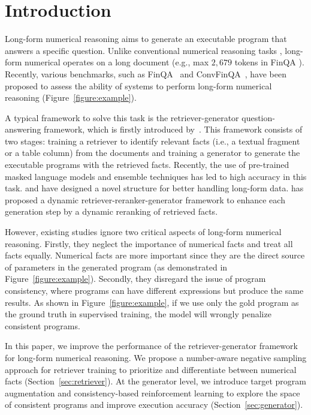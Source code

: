 \documentclass[11pt]{article}
\begin{document}
\section{Introduction}
Long-form numerical reasoning aims to generate an executable program that answers a specific question. Unlike conventional numerical reasoning tasks \cite{mackenzie2008engine}, long-form numerical operates on a long document (e.g., max $2,679$ tokens in FinQA \cite{chen2021finqa}). Recently, various benchmarks, such as FinQA~\cite{chen2021finqa} and ConvFinQA~\cite{convfinqa}, have been proposed to assess the ability of systems to perform long-form numerical reasoning (Figure~\ref{figure:example}). 






A typical framework to solve this task is the retriever-generator question-answering framework, which is firstly introduced by~\citet{chen2021finqa}. 
This framework consists of two stages: training a retriever to identify relevant facts (i.e., a textual fragment or a table column) from the documents and training a generator to generate the executable programs with the retrieved facts. Recently, the use of pre-trained masked language models and ensemble techniques \cite{wang2022novel, zhang2022robustly, wang2022numerical} has led to high accuracy in this task. \citet{zhang2022elastic} and \citet{tablet5} have designed a novel structure for better handling long-form data. \citet{dyrren} has proposed a dynamic retriever-reranker-generator framework to enhance each generation step by a dynamic reranking of retrieved facts.




However, existing studies ignore two critical aspects of long-form numerical reasoning. Firstly, they neglect the importance of numerical facts and treat all facts equally. Numerical facts are more important since they are the direct source of parameters in the generated program (as demonstrated in Figure~\ref{figure:example}). Secondly, they disregard the issue of program consistency, where programs can have different expressions but produce the same results. As shown in Figure~\ref{figure:example}, if we use only the gold program as the ground truth in supervised training, the model will wrongly penalize consistent programs.



In this paper, we improve the performance of the retriever-generator framework for long-form numerical reasoning.  We propose a number-aware negative sampling approach for retriever training to prioritize and differentiate between numerical facts (Section~\ref{sec:retriever}). At the generator level, we introduce target program augmentation and consistency-based reinforcement learning to explore the space of consistent programs and improve execution accuracy (Section~\ref{sec:generator}). 
\end{document}
